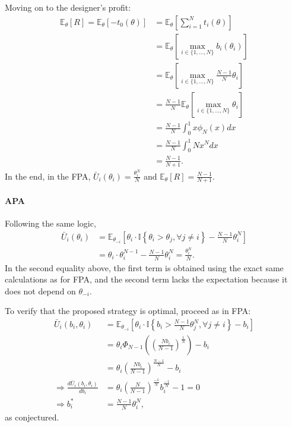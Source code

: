 \documentclass[a4paper]{article}
\begin{document}
Moving on to the designer's profit: 
\begin{align*}
	\mathbb{E}_\theta [R] = \mathbb{E}_\theta[-t_0(\theta)]
	&= \mathbb{E}_\theta \left[ \sum_{i=1}^N t_i(\theta) \right]
	\\
	&= \mathbb{E}_\theta \left[ \max_{i \in \{1,...,N\}} b_i(\theta_i) \right]
	\\
	&= \mathbb{E}_\theta \left[ \max_{i \in \{1,...,N\}} \frac{N-1}{N} \theta_i \right]
	\\
	&= \frac{N-1}{N} \mathbb{E}_\theta \left[ \max_{i \in \{1,...,N\}} \theta_i \right]
	\\
	&= \frac{N-1}{N} \int_0^1 x \phi_{N} (x) dx
	\\
	&= \frac{N-1}{N} \int_0^1 N x^N dx
	\\
	&= \frac{N-1}{N+1}.
\end{align*}
In the end, in the FPA, $\bar{U}_i(\theta_i) = \frac{\theta_i^N}{N}$ and $\mathbb{E}_\theta [R] = 
\frac{N-1}{N+1}$.


\paragraph*{APA}
Following the same logic,
\begin{align*}
	\bar{U}_i(\theta_i) &= \mathbb{E}_{\theta_{-i}} \left[ \theta_i \cdot \mathbb{I} \left\{ \theta_i > \theta_j, \forall j \neq i \right\} - \frac{N-1}{N} \theta_i^N \right]
	\\
	&= \theta_i \cdot \theta_i^{N-1} - \frac{N-1}{N} \theta_i^N
	= \frac{\theta_i^N}{N}.
\end{align*}
In the second equality above, the first term is obtained using the exact same calculations as for FPA, and the second term lacks the expectation because it does not depend on $\theta_{-i}$.

To verify that the proposed strategy is optimal, proceed as in FPA:
\begin{align*}
	\bar{U}_i(b_i,\theta_i) &= \mathbb{E}_{\theta_{-i}} \left[ \theta_i \cdot \mathbb{I} \left\{ b_i > \frac{N-1}{N} \theta_j^N, \forall j \neq i \right\} - b_i \right]
	\\
	&= \theta_i \Phi_{N-1} \left( \left( \frac{ N b_i}{N-1} \right)^\frac{1}{N} \right) - b_i
	\\
	&= \theta_i \left( \frac{ N b_i}{N-1} \right)^\frac{N-1}{N} - b_i
	\\ \Rightarrow
	\frac{d \bar{U}_i(b_i,\theta_i)}{db_i} 
	&= \theta_i \left( \frac{ N }{N-1} \right)^\frac{-1}{N} b_i^\frac{-1}{N} - 1 = 0
	\\ \Rightarrow
	b_i^* &= \frac{N-1}{N} \theta_i^N,
\end{align*}
as conjectured.
\end{document}
